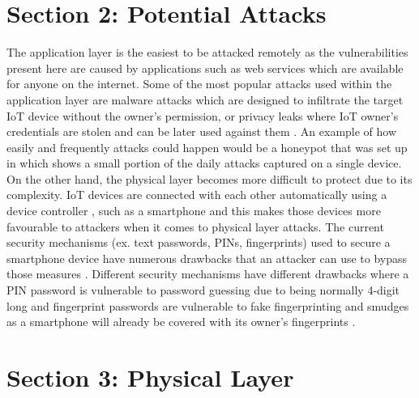 \documentclass[11pt,a4paper]{article}
\begin{document}
\section*{Section 2: Potential Attacks}

The application layer is the easiest to be attacked remotely as the vulnerabilities present here are caused by applications such as web services which are available for anyone on the internet. Some of the most popular attacks used within the application layer are malware attacks which are designed to infiltrate the target IoT device without the owner’s permission, or privacy leaks where IoT owner’s credentials are stolen and can be later used against them \cite{7}. An example of how easily and frequently attacks could happen would be a honeypot that was set up in \cite{2} which shows a small portion of the daily attacks captured on a single device. On the other hand, the physical layer becomes more difficult to protect due to its complexity. IoT devices are connected with each other automatically using a device controller \cite{5}, such as a smartphone and this makes those devices more favourable to attackers when it comes to physical layer attacks. The current security mechanisms (ex. text passwords, PINs, fingerprints) used to secure a smartphone device have numerous drawbacks that an attacker can use to bypass those measures \cite{5}. Different security mechanisms have different drawbacks where a PIN password is vulnerable to password guessing due to being normally 4-digit long and fingerprint passwords are vulnerable to fake fingerprinting and smudges as a smartphone will already be covered with its owner’s fingerprints \cite{5}.


\section*{Section 3: Physical Layer}
\end{document}
